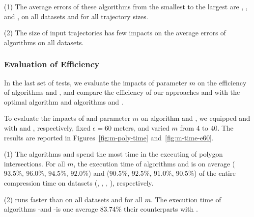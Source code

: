 \ni(1) The average errors of these algorithms from the smallest to the largest are \squishe, \dps, \cist and \cista, on all datasets and for all trajectory sizes. %

\ni(2) The size of input trajectories has few impacts on the average errors of \lsa algorithms on all datasets.





\subsubsection{Evaluation of Efficiency}

In the last set of tests, we evaluate the impacts of parameter $m$ on the efficiency of algorithms \cist and \cista, and compare the efficiency of our approaches \cist and \cista with the optimal algorithm and algorithms \dps and \squishe.

%

To evaluate the impacts of \rpia and parameter $m$ on algorithm \cist and \cista, we
equipped \cist and \cista with \rpia and \cpia, respectively, fixed $\epsilon =60$ meters, and varied $m$ from $4$ to $40$.
%
The results are reported in Figures~\ref{fig:m-poly-time} and~\ref{fig:m-time-e60}.

\ni(1) The algorithms \cist and \cista spend the most time in the executing of
polygon intersections. For all $m$, the execution time of algorithms \cpia and
\rpia is on average {($93.5\%$, $96.0\%$, $94.5\%$, $92.0\%$)
	and ($90.5\%$, $92.5\%$, $91.0\%$, $90.5\%$)} of the entire compression  time on {datasets}
(\sercar, \geolife, \mopsi, \pricar), respectively.

\ni(2) \rpia runs faster than \cpia on all datasets and for all $m$. The execution time of algorithms \cist-\rpia and \cista-\rpia is one average $83.74\%$ their counterparts with \cpia.


